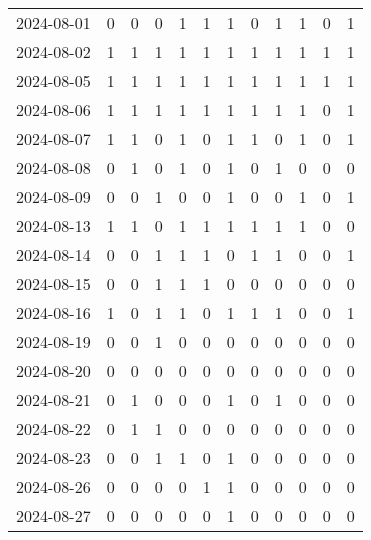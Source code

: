 \documentclass[dvipdfmx,oneside]{article}
\begin{document}
\begin{tabular}{lccccccccccc}
        2024-08-01 &     0 &     0 &     0 &     1 &     1 &     1 &     0 &     1 &     1 &     0 &     1 \\
        2024-08-02 &     1 &     1 &     1 &     1 &     1 &     1 &     1 &     1 &     1 &     1 &     1 \\
        2024-08-05 &     1 &     1 &     1 &     1 &     1 &     1 &     1 &     1 &     1 &     1 &     1 \\
        2024-08-06 &     1 &     1 &     1 &     1 &     1 &     1 &     1 &     1 &     1 &     0 &     1 \\
        2024-08-07 &     1 &     1 &     0 &     1 &     0 &     1 &     1 &     0 &     1 &     0 &     1 \\
        2024-08-08 &     0 &     1 &     0 &     1 &     0 &     1 &     0 &     1 &     0 &     0 &     0 \\
        2024-08-09 &     0 &     0 &     1 &     0 &     0 &     1 &     0 &     0 &     1 &     0 &     1 \\
        2024-08-13 &     1 &     1 &     0 &     1 &     1 &     1 &     1 &     1 &     1 &     0 &     0 \\
        2024-08-14 &     0 &     0 &     1 &     1 &     1 &     0 &     1 &     1 &     0 &     0 &     1 \\
        2024-08-15 &     0 &     0 &     1 &     1 &     1 &     0 &     0 &     0 &     0 &     0 &     0 \\
        2024-08-16 &     1 &     0 &     1 &     1 &     0 &     1 &     1 &     1 &     0 &     0 &     1 \\
        2024-08-19 &     0 &     0 &     1 &     0 &     0 &     0 &     0 &     0 &     0 &     0 &     0 \\
        2024-08-20 &     0 &     0 &     0 &     0 &     0 &     0 &     0 &     0 &     0 &     0 &     0 \\
        2024-08-21 &     0 &     1 &     0 &     0 &     0 &     1 &     0 &     1 &     0 &     0 &     0 \\
        2024-08-22 &     0 &     1 &     1 &     0 &     0 &     0 &     0 &     0 &     0 &     0 &     0 \\
        2024-08-23 &     0 &     0 &     1 &     1 &     0 &     1 &     0 &     0 &     0 &     0 &     0 \\
        2024-08-26 &     0 &     0 &     0 &     0 &     1 &     1 &     0 &     0 &     0 &     0 &     0 \\
        2024-08-27 &     0 &     0 &     0 &     0 &     0 &     1 &     0 &     0 &     0 &     0 &     0 \\

\end{tabular}
\end{document}
